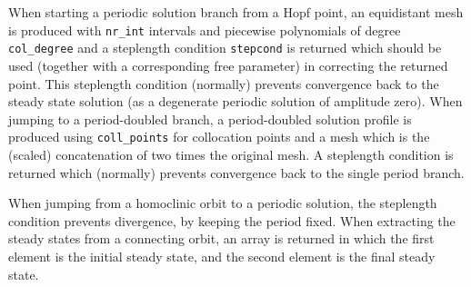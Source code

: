 \documentclass[10pt]{scrartcl}
\newcommand{\blist}[1]{\mbox{\lstinline!#1!}}
\begin{document}
{When starting a periodic solution branch from a Hopf point, an
equidistant mesh is produced with \blist{nr_int} intervals and
piecewise polynomials of degree \blist{col_degree} and a steplength
condition \blist{stepcond} is returned which should be used (together
with a corresponding free parameter) in correcting the returned
point. This steplength condition (normally) prevents convergence back
to the steady state solution (as a degenerate periodic solution of
amplitude zero). When jumping to a period-doubled branch, a
period-doubled solution profile is produced using \blist{coll_points}
for collocation points and a mesh which is the (scaled) concatenation
of two times the original mesh.  A steplength condition is returned
which (normally) prevents convergence back to the single period
branch.

When jumping from a homoclinic orbit to a periodic solution, the
steplength condition prevents divergence, by keeping the period fixed.
When extracting the steady states from a connecting orbit, an array is
returned in which the first element is the initial steady state, and
the second element is the final steady state.

}
\end{document}
